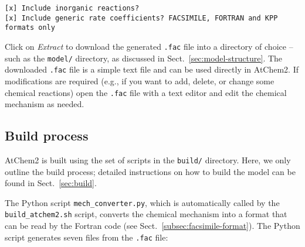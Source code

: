 \begin{verbatim}
[x] Include inorganic reactions?
[x] Include generic rate coefficients? FACSIMILE, FORTRAN and KPP formats only
\end{verbatim}

Click on \emph{Extract} to download the generated \texttt{.fac} file
into a directory of choice -- such as the \texttt{model/} directory,
as discussed in Sect.~\ref{sec:model-structure}. The downloaded
\texttt{.fac} file is a simple text file and can be used directly in
AtChem2. If modifications are required (e.g., if you want to add,
delete, or change some chemical reactions) open the \texttt{.fac} file
with a text editor and edit the chemical mechanism as needed.

\subsection{Build process} \label{subsec:build-process}

AtChem2 is built using the set of scripts in the \texttt{build/}
directory. Here, we only outline the build process; detailed
instructions on how to build the model can be found in
Sect.~\ref{sec:build}.

The Python script \texttt{mech\_converter.py}, which is automatically
called by the \texttt{build\_atchem2.sh} script, converts the chemical
mechanism into a format that can be read by the Fortran code (see
Sect.~\ref{subsec:facsimile-format}). The Python script generates
seven files from the \texttt{.fac} file:

